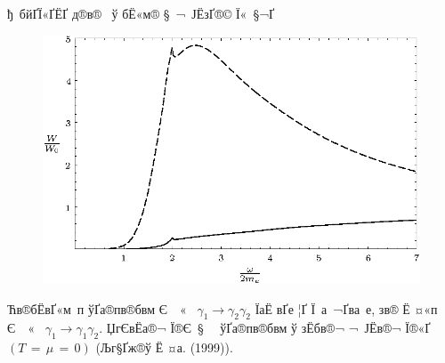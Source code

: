 \begin{Slide}{ђ бйҐЇ«Ґ­ЁҐ д®в®­  ў бЁ«м­® § ¬ Ј­ЁзҐ­­®© Ї« §¬Ґ} 

\begin{center}

\begin{figure}[tb]
\centerline{\includegraphics*[scale=1.]{fig7.eps}}

\vspace{5mm}

\end{figure}

Ћв­®бЁвҐ«м­ п ўҐа®пв­®бвм Є ­ «  $\gamma_1 \to \gamma_2 \gamma_2$ 
ЇаЁ вҐе ¦Ґ Ї а ¬Ґва е, зв® Ё ¤«п Є ­ «  $\gamma_1 \to \gamma_1 \gamma_2$.
Џг­ЄвЁа®¬ Ї®Є § ­  ўҐа®пв­®бвм ў 
зЁбв®¬ ¬ Ј­Ёв­®¬ Ї®«Ґ $(T \, = \, \mu \, = \, 0)$ 
(Љг§­Ґж®ў Ё ¤а. (1999)).

\end{center}

\end{Slide}


